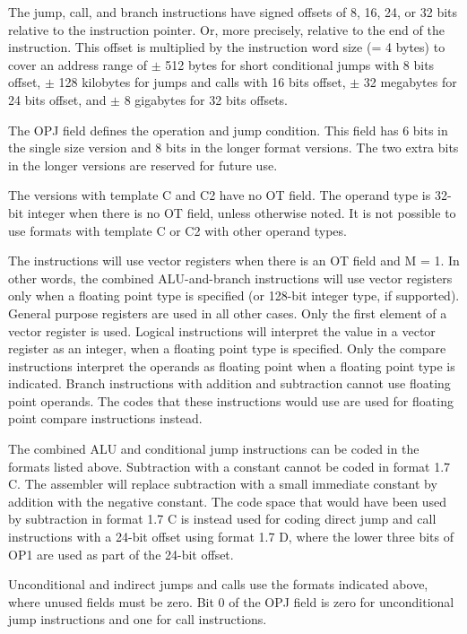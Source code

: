 \documentclass[forwardcom.tex]{subfiles}
\begin{document}
The jump, call, and branch instructions have signed offsets of 8, 16, 24, or 32 bits relative to the instruction pointer. Or, more precisely, relative to the end of the instruction. This offset is multiplied by the instruction word size (= 4 bytes) to cover an address range of $\pm$ 512 bytes for short conditional jumps with 8 bits offset, $\pm$ 128 kilobytes for jumps and calls with 16 bits offset, $\pm$ 32 megabytes for 24 bits offset, and $\pm$ 8 gigabytes for 32 bits offsets.
\vv

The OPJ field defines the operation and jump condition. This field has 6 bits in the single size version and 8 bits in the longer format versions. The two extra bits in the longer versions are reserved for future use.
\vv

The versions with template C and C2 have no OT field. The operand type is 32-bit integer when there is no OT field, unless otherwise noted. It is not possible to use formats with template C or C2 with other operand types. 
\vv

The instructions will use vector registers when there is an OT field and M = 1. In other words, the combined ALU-and-branch instructions will use vector registers only when a floating point type is specified (or 128-bit integer type, if supported). General purpose registers are used in all other cases. Only the first element of a vector register is used. 
Logical instructions will interpret the value in a vector register as an integer, when a floating point type is specified. Only the compare instructions interpret the operands as floating point when a floating point type is indicated. Branch instructions with addition and subtraction cannot use floating point operands. The codes that these instructions would use are used for floating point compare instructions instead.
\vv

The combined ALU and conditional jump instructions can be coded in the formats listed above. Subtraction with a constant cannot be coded in format 1.7 C. The assembler will replace subtraction with a small immediate constant by addition with the negative constant. The code space that would have been used by subtraction in format 1.7 C is instead used for coding direct jump and call instructions with a 24-bit offset using format 1.7 D, where the lower three bits of OP1 are used as part of the 24-bit offset.
\vv

Unconditional and indirect jumps and calls use the formats indicated above, where unused fields must be zero. Bit 0 of the OPJ field is zero for unconditional jump instructions and one for call instructions.
\vv
\end{document}
